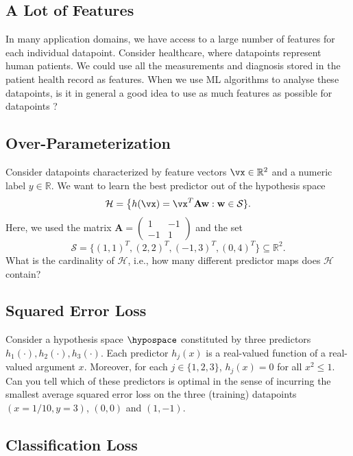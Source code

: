 \documentclass[12pt]{report}
\begin{document}
  \subsection{A Lot of Features}
 \label{ex_2_toomanyfeatures}
In many application domains, we have access to a large number of features for 
each individual datapoint. Consider healthcare, where datapoints represent 
human patients. We could use all the measurements and diagnosis stored in 
the patient health record as features. When we use ML algorithms to 
analyse these datapoints, is it in general a good idea to use as much 
features as possible for datapoints ? 
 
  \subsection{Over-Parameterization}
 \label{ex_2_overparm}
Consider datapoints characterized by feature vectors $\vx \in \mathbb{R}^{2}$ and 
a numeric label $y \in \mathbb{R}$. We want to learn the best 
predictor out of the hypothesis space 
$$ \mathcal{H} = \big\{ h(\vx) = \vx^{T} \mathbf{A} \mathbf{w}: \mathbf{w} \in \mathcal{S} \}. $$
Here, we used the matrix 
$\mathbf{A} = \begin{pmatrix} 1 & -1 \\ -1 & 1 \end{pmatrix}$ and 
the set $$\mathcal{S} = \big\{ (1,1)^{T}, (2,2)^{T}, (-1,3)^{T}, (0,4)^{T} \big\} \subseteq \mathbb{R}^{2}.$$ 
What is the cardinality of $\mathcal{H}$, i.e., how many 
different predictor maps does $\mathcal{H}$ contain?
 
  \subsection{Squared Error Loss}
 \label{ex_2_4}
 Consider a hypothesis space $\hypospace$ constituted by three predictors $h_{1}(\cdot), h_{2}(\cdot),h_{3}(\cdot)$. 
 Each predictor $h_{j}(x)$ is a real-valued function of a real-valued argument $x$. Moreover, for each $j \in \{1,2,3\}$, 
 $h_{j}(x) = 0$ for all $x^2 \leq 1$. Can you tell which of these predictors is optimal in the sense of incurring the 
 smallest average squared error loss on the three (training) datapoints $(x=1/10,y=3)$, $(0,0)$ and $(1,-1)$. 
 
 \subsection{Classification Loss} 
 \label{ex_2_classif_loss}
 \begin{center}
 \end{center}
 
\end{document}
